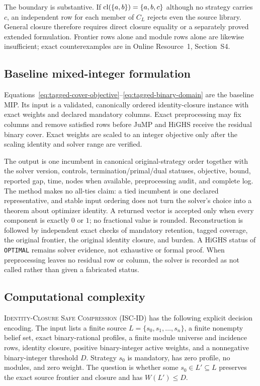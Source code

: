 The boundary is substantive.  If
\(\operatorname{cl}(\{a,b\})=\{a,b,c\}\) although no strategy carries \(c\), an independent
row for each member of \(C_L\) rejects even the source library.  General
closure therefore requires direct closure equality or a separately proved
extended formulation.  Frontier rows alone and module rows alone are likewise
insufficient; exact counterexamples are in Online Resource~1, Section~S4.

\subsection{Baseline mixed-integer formulation}
\label{subsec:aor-baseline-mip}

Equations~\eqref{eq:tagged-cover-objective}--\eqref{eq:tagged-binary-domain}
are the baseline MIP.  Its input is a validated, canonically ordered
identity-closure instance with exact weights and declared mandatory columns.
Exact preprocessing may fix columns and remove satisfied rows before JuMP and
HiGHS receive the residual binary cover.  Exact weights are scaled to an
integer objective only after the scaling identity and solver range are
verified.

The output is one incumbent in canonical original-strategy order together with
the solver version, controls, termination/primal/dual statuses, objective,
bound, reported gap, time, nodes when available, preprocessing audit, and
complete log.  The method makes no all-ties claim: a tied incumbent is one
declared representative, and stable input ordering does not turn the solver's
choice into a theorem about optimizer identity.  A returned vector is accepted
only when every component is exactly \(0\) or \(1\); no fractional value is
rounded.  Reconstruction is followed by independent exact checks of mandatory
retention, tagged coverage, the original frontier, the original identity
closure, and burden.  A HiGHS status of \texttt{OPTIMAL} remains solver
evidence, not exhaustive or formal proof.  When preprocessing leaves no
residual row or column, the solver is recorded as not called rather than given
a fabricated status.

\subsection{Computational complexity}
\label{subsec:aor-safe-compression-complexity}

\textsc{Identity-Closure Safe Compression} (\textsc{ISC-ID}) has the following
explicit decision encoding.  The input lists a finite source
\(L=\{s_0,s_1,\ldots,s_n\}\), a finite nonempty belief set, exact
binary-rational profiles, a finite module universe and incidence rows,
identity closure, positive binary-integer active weights, and a nonnegative
binary-integer threshold \(D\).  Strategy \(s_0\) is mandatory, has zero
profile, no modules, and zero weight.  The question is whether some
\(s_0\in L'\subseteq L\) preserves the exact source frontier and closure and
has \(W(L')\leq D\).

